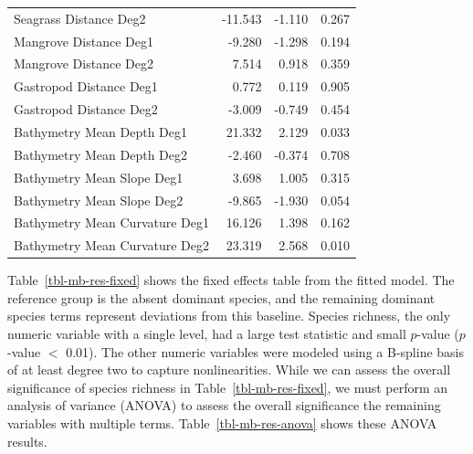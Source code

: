 \documentclass[
  letterpaper,
  DIV=11,
  numbers=noendperiod]{scrartcl}
\begin{document}
\begin{table}
{\begin{tabular}{lrrr}
  Seagrass Distance Deg2 & -11.543 & -1.110 & 0.267 \\ 
  Mangrove Distance Deg1 & -9.280 & -1.298 & 0.194 \\ 
  Mangrove Distance Deg2 & 7.514 & 0.918 & 0.359 \\ 
  Gastropod Distance Deg1 & 0.772 & 0.119 & 0.905 \\ 
  Gastropod Distance Deg2 & -3.009 & -0.749 & 0.454 \\ 
  Bathymetry Mean Depth Deg1 & 21.332 & 2.129 & 0.033 \\ 
  Bathymetry Mean Depth Deg2 & -2.460 & -0.374 & 0.708 \\ 
  Bathymetry Mean Slope Deg1 & 3.698 & 1.005 & 0.315 \\ 
  Bathymetry Mean Slope Deg2 & -9.865 & -1.930 & 0.054 \\ 
  Bathymetry Mean Curvature Deg1 & 16.126 & 1.398 & 0.162 \\ 
  Bathymetry Mean Curvature Deg2 & 23.319 & 2.568 & 0.010 \\ 
   \bottomrule
\end{tabular}

}

\end{table}%

Table~\ref{tbl-mb-res-fixed} shows the fixed effects table from the
fitted model. The reference group is the absent dominant species, and
the remaining dominant species terms represent deviations from this
baseline. Species richness, the only numeric variable with a single
level, had a large test statistic and small \(p\)-value (\(p\)-value
\(<\) 0.01). The other numeric variables were modeled using a B-spline
basis of at least degree two to capture nonlinearities. While we can
assess the overall significance of species richness in
Table~\ref{tbl-mb-res-fixed}, we must perform an analysis of variance
(ANOVA) to assess the overall significance the remaining variables with
multiple terms. Table~\ref{tbl-mb-res-anova} shows these ANOVA results.
\end{document}
